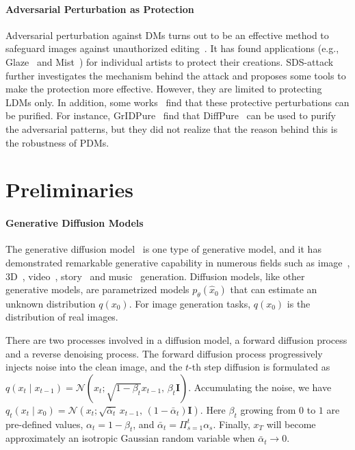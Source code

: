 \documentclass{article}
\begin{document}
\paragraph{Adversarial Perturbation as Protection} Adversarial perturbation against DMs turns out to be an effective method to safeguard images against unauthorized editing~\cite{advdm, glaze,salman2023raising, sdsattack, mist-v2, chen2024smoothattack,ahn2024imperceptible, metacloak}. It has found applications (e.g., Glaze~\cite{glaze} and Mist~\cite{mist-v2, liang2023mist}) for individual artists to protect their creations. SDS-attack~\cite{sdsattack} further investigates the mechanism behind the attack and proposes some tools to make the protection more effective. However, they are limited to protecting LDMs only.
In addition, some works~\cite{zhao2023can, sandoval2023jpeg} find that these protective perturbations can be purified. For instance, GrIDPure~\cite{zhao2023can} find that DiffPure~\cite{nie2022diffusion} can be used to purify the adversarial patterns, but they did not realize that the reason behind this is the robustness of PDMs.





\section{Preliminaries}

\paragraph{Generative Diffusion Models}

The generative diffusion model~
\cite{ddpm, song2020score} is one type of generative model, and it has demonstrated remarkable generative capability in numerous fields such as image~\cite{ldm, balaji2022ediffi}, 3D~\cite{poole2022dreamfusion, lin2022magic3d}, video~\cite{vdm,makeavideo}, story~\cite{pan2022story, rahman2023make} and music~\cite{musicdiff, huang2023noise2music} generation. Diffusion models, like other generative models, are parametrized models $p_{\theta}(\hat{x}_0)$ that can estimate an unknown distribution $q(x_0)$. For image generation tasks, $q(x_0)$ is the distribution of real images.

There are two processes involved in a diffusion model, a forward diffusion process and a reverse denoising process. The forward diffusion process progressively injects noise into the clean image, and the $t$-th step diffusion is formulated as $q(x_t \mid x_{t-1} ) = \mathcal{N} (x_t; \sqrt{1 - \beta_t}x_{t-1}, \, \beta_t \mathbf{I})$. Accumulating the noise, we have $    q_t(x_t \mid x_0 ) = \mathcal{N} (x_t; \sqrt{\bar{\alpha}_t} \, x_{t-1}, \, (1-\bar{\alpha}_t) \mathbf{I})$. Here $\beta_t$ growing from $0$ to $1$ are pre-defined values,  $\alpha_t = 1-\beta_t$, and $\bar{\alpha}_t = \Pi_{s=1}^{t} \alpha_s$. Finally, $x_T$ will become approximately an isotropic Gaussian random variable when $\bar{\alpha}_t \rightarrow 0$. 
\end{document}
